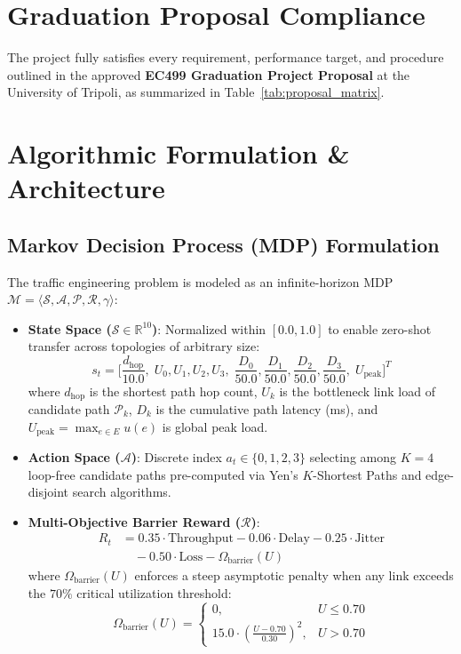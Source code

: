 \documentclass[10pt,twocolumn,a4paper]{article}
\begin{document}
\section{Graduation Proposal Compliance}

The project fully satisfies every requirement, performance target, and procedure outlined in the approved \textbf{EC499 Graduation Project Proposal} at the University of Tripoli, as summarized in Table~\ref{tab:proposal_matrix}.

\section{Algorithmic Formulation \& Architecture}

\subsection{Markov Decision Process (MDP) Formulation}
The traffic engineering problem is modeled as an infinite-horizon MDP $\mathcal{M} = \langle \mathcal{S}, \mathcal{A}, \mathcal{P}, \mathcal{R}, \gamma \rangle$:

\begin{itemize}[leftmargin=*,itemsep=2pt,topsep=2pt]
    \item \textbf{State Space ($\mathcal{S} \in \mathbb{R}^{10}$)}: Normalized within $[0.0, 1.0]$ to enable zero-shot transfer across topologies of arbitrary size:
    \begin{equation}
        s_t = \Big[ \frac{d_{\text{hop}}}{10.0}, \; U_0, U_1, U_2, U_3, \; \frac{D_0}{50.0}, \frac{D_1}{50.0}, \frac{D_2}{50.0}, \frac{D_3}{50.0}, \; U_{\text{peak}} \Big]^T
    \end{equation}
    where $d_{\text{hop}}$ is the shortest path hop count, $U_k$ is the bottleneck link load of candidate path $\mathcal{P}_k$, $D_k$ is the cumulative path latency (ms), and $U_{\text{peak}} = \max_{e \in E} u(e)$ is global peak load.
    \item \textbf{Action Space ($\mathcal{A}$)}: Discrete index $a_t \in \{0, 1, 2, 3\}$ selecting among $K=4$ loop-free candidate paths pre-computed via Yen's $K$-Shortest Paths and edge-disjoint search algorithms.
    \item \textbf{Multi-Objective Barrier Reward ($\mathcal{R}$)}:
    \begin{align}
        R_t &= 0.35 \cdot \text{Throughput} - 0.06 \cdot \text{Delay} - 0.25 \cdot \text{Jitter} \nonumber\\
            &\quad - 0.50 \cdot \text{Loss} - \Omega_{\text{barrier}}(U)
    \end{align}
    where $\Omega_{\text{barrier}}(U)$ enforces a steep asymptotic penalty when any link exceeds the $70\%$ critical utilization threshold:
    \begin{equation}
        \Omega_{\text{barrier}}(U) = 
        \begin{cases} 
            0, & U \le 0.70 \\
            15.0 \cdot \left(\frac{U - 0.70}{0.30}\right)^2, & U > 0.70 
        \end{cases}
    \end{equation}
\end{itemize}
\end{document}
